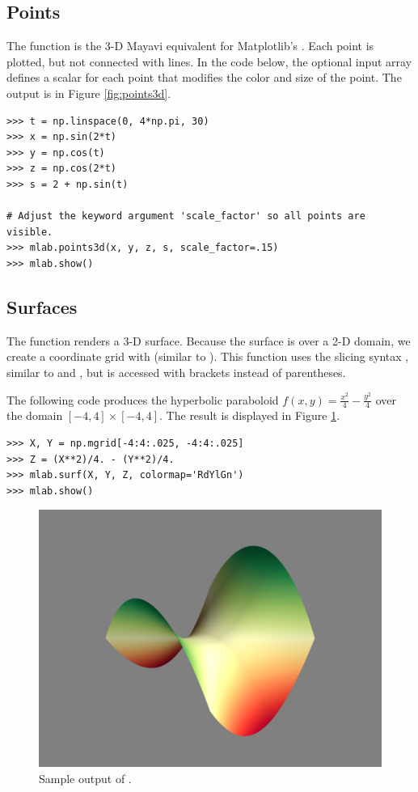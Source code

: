 \subsection*{Points} %

The function  is the 3-D Mayavi equivalent for Matplotlib's .
Each point is plotted, but not connected with lines.
In the code below, the optional input array  defines a scalar for each point that modifies the color and size of the point.
The output is in Figure \ref{fig:points3d}.

\begin{lstlisting}
>>> t = np.linspace(0, 4*np.pi, 30)
>>> x = np.sin(2*t)
>>> y = np.cos(t)
>>> z = np.cos(2*t)
>>> s = 2 + np.sin(t)

# Adjust the keyword argument 'scale_factor' so all points are visible.
>>> mlab.points3d(x, y, z, s, scale_factor=.15)
>>> mlab.show()
\end{lstlisting}

\subsection*{Surfaces} %

The function  renders a 3-D surface.
Because the surface is over a 2-D domain, we create a coordinate grid with  (similar to ).
This function uses the slicing syntax , similar to  and , but is accessed with brackets instead of parentheses.

The following code produces the hyperbolic paraboloid $f(x,y) = \frac{x^2}{4} - \frac{y^2}{4}$ over the domain $[-4,4]\times[-4,4]$.
The result is displayed in Figure \ref{fig:surf_example}.

\begin{lstlisting}
>>> X, Y = np.mgrid[-4:4:.025, -4:4:.025]
>>> Z = (X**2)/4. - (Y**2)/4.
>>> mlab.surf(X, Y, Z, colormap='RdYlGn')
>>> mlab.show()
\end{lstlisting}

\begin{figure}
\includegraphics[width=.7\textwidth]{mesh_example.pdf}
\caption{Sample output of .}
\label{fig:surf_example}
\end{figure}

